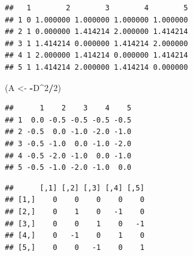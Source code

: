 \documentclass[]{book}
\newenvironment{Shaded}{\begin{snugshade}}{\end{snugshade}}
\newcommand{\CommentTok}[1]{\textcolor[rgb]{0.56,0.35,0.01}{\textit{#1}}}
\newcommand{\DataTypeTok}[1]{\textcolor[rgb]{0.13,0.29,0.53}{#1}}
\newcommand{\DecValTok}[1]{\textcolor[rgb]{0.00,0.00,0.81}{#1}}
\newcommand{\KeywordTok}[1]{\textcolor[rgb]{0.13,0.29,0.53}{\textbf{#1}}}
\newcommand{\NormalTok}[1]{#1}
\newcommand{\OperatorTok}[1]{\textcolor[rgb]{0.81,0.36,0.00}{\textbf{#1}}}
\newcommand{\StringTok}[1]{\textcolor[rgb]{0.31,0.60,0.02}{#1}}
\theoremstyle{definition}
\theoremstyle{definition}
\theoremstyle{definition}
\theoremstyle{remark}
\begin{document}
\begin{verbatim}
##   1        2        3        4        5
## 1 0 1.000000 1.000000 1.000000 1.000000
## 2 1 0.000000 1.414214 2.000000 1.414214
## 3 1 1.414214 0.000000 1.414214 2.000000
## 4 1 2.000000 1.414214 0.000000 1.414214
## 5 1 1.414214 2.000000 1.414214 0.000000
\end{verbatim}

\begin{Shaded}
\begin{Highlighting}[]
\NormalTok{(A <-}\StringTok{ }\OperatorTok{-}\NormalTok{D}\OperatorTok{^}\DecValTok{2}\OperatorTok{/}\DecValTok{2}\NormalTok{)}
\end{Highlighting}
\end{Shaded}

\begin{verbatim}
##      1    2    3    4    5
## 1  0.0 -0.5 -0.5 -0.5 -0.5
## 2 -0.5  0.0 -1.0 -2.0 -1.0
## 3 -0.5 -1.0  0.0 -1.0 -2.0
## 4 -0.5 -2.0 -1.0  0.0 -1.0
## 5 -0.5 -1.0 -2.0 -1.0  0.0
\end{verbatim}

\begin{Shaded}
\end{Shaded}

\begin{verbatim}
##      [,1] [,2] [,3] [,4] [,5]
## [1,]    0    0    0    0    0
## [2,]    0    1    0   -1    0
## [3,]    0    0    1    0   -1
## [4,]    0   -1    0    1    0
## [5,]    0    0   -1    0    1
\end{verbatim}

\begin{Shaded}
\end{Shaded}
\end{document}
